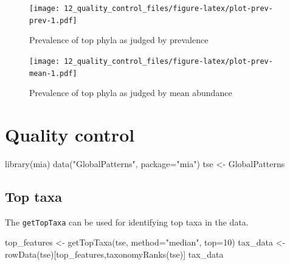 \documentclass[
]{book}
\newenvironment{Shaded}{\begin{snugshade}}{\end{snugshade}}
\newcommand{\AttributeTok}[1]{\textcolor[rgb]{0.77,0.63,0.00}{#1}}
\newcommand{\DecValTok}[1]{\textcolor[rgb]{0.00,0.00,0.81}{#1}}
\newcommand{\FunctionTok}[1]{\textcolor[rgb]{0.00,0.00,0.00}{#1}}
\newcommand{\NormalTok}[1]{#1}
\newcommand{\OtherTok}[1]{\textcolor[rgb]{0.56,0.35,0.01}{#1}}
\newcommand{\SpecialCharTok}[1]{\textcolor[rgb]{0.00,0.00,0.00}{#1}}
\newcommand{\StringTok}[1]{\textcolor[rgb]{0.31,0.60,0.02}{#1}}
\begin{document}
\begin{figure}
\centering
\texttt{[image: 12\_quality\_control\_files/figure-latex/plot-prev-prev-1.pdf]}
\caption{\label{fig:plot-prev-prev}Prevalence of top phyla as judged by prevalence}
\end{figure}

\begin{Shaded}
\end{Shaded}

\begin{figure}
\centering
\texttt{[image: 12\_quality\_control\_files/figure-latex/plot-prev-mean-1.pdf]}
\caption{\label{fig:plot-prev-mean}Prevalence of top phyla as judged by mean abundance}
\end{figure}

\hypertarget{quality-control-1}{%
\section{Quality control}\label{quality-control-1}}

\begin{Shaded}
\begin{Highlighting}[]
\FunctionTok{library}\NormalTok{(mia)}
\FunctionTok{data}\NormalTok{(}\StringTok{"GlobalPatterns"}\NormalTok{, }\AttributeTok{package=}\StringTok{"mia"}\NormalTok{)}
\NormalTok{tse }\OtherTok{\textless{}{-}}\NormalTok{ GlobalPatterns }
\end{Highlighting}
\end{Shaded}

\hypertarget{top-taxa}{%
\subsection{Top taxa}\label{top-taxa}}

The \texttt{getTopTaxa} can be used for identifying top taxa in the data.

\begin{Shaded}
\begin{Highlighting}[]
\NormalTok{top\_features }\OtherTok{\textless{}{-}} \FunctionTok{getTopTaxa}\NormalTok{(tse, }\AttributeTok{method=}\StringTok{"median"}\NormalTok{, }\AttributeTok{top=}\DecValTok{10}\NormalTok{)}
\NormalTok{tax\_data }\OtherTok{\textless{}{-}} \FunctionTok{rowData}\NormalTok{(tse)[top\_features,}\FunctionTok{taxonomyRanks}\NormalTok{(tse)]}
\NormalTok{tax\_data}
\end{Highlighting}
\end{Shaded}
\end{document}
